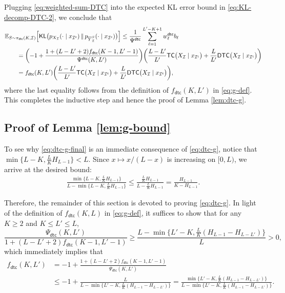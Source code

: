 \documentclass[english]{article}
\newcommand{\cI}{\mathcal{I}}
\newcommand{\bE}{\mathbb{E}}
\newcommand{\KL}{\mathsf{KL}}
\newcommand{\ol}{\overline}
\newcommand{\TC}{\mathsf{TC}}
\newcommand{\DTC}{\mathsf{DTC}}
\newcommand{\dtc}{\mathsf{dtc}}
\begin{document}
Plugging \eqref{eq:weighted-sum-DTC} into the expected KL error bound in \eqref{eq:KL-decomp-DTC-2}, we conclude that
\begin{align}
    &\bE_{S \sim \pi_{\dtc}(K, \cI)} \Big[\KL\big(p_{X_{\cI}}(\cdot \mid x_{\cI^\mathsf{c}}) \,\|\, p_{\ol Y_{\cI}^S}(\cdot \mid x_{\cI^\mathsf{c}}) \big)\Big] 
    \leq \frac{1}{\Psi^\dtc}\sum_{\ell = 1}^{L'-K+1} w^\dtc_{\ell} b_{\ell} \notag\\
     &\qquad = \biggl(-1 + \frac{1 + (L-L'+2)f_\dtc(K-1, L'-1)}{\Psi^\dtc(K, L')}\biggr) \bigg( \frac{L-L'}{L'}\TC\big(X_{\cI} \mid x_{\cI^\mathsf{c}} \big) + \frac{L}{L'}\DTC\big(X_{\cI} \mid x_{\cI^\mathsf{c}} \big)\bigg) \notag\\
     &\qquad = f_\dtc(K, L') \bigg( \frac{L-L'}{L'}\TC\big(X_{\cI} \mid x_{\cI^\mathsf{c}} \big) + \frac{L}{L'}\DTC\big(X_{\cI} \mid x_{\cI^\mathsf{c}} \big)\bigg), \label{eq:KL-bound-final-DTC}
\end{align}
where the last equality follows from the definition of $ f_\dtc(K, L') $ in \eqref{eq:g-def}.
This completes the inductive step and hence the proof of Lemma \ref{lem:dtc-g}.



\subsection{Proof of Lemma \ref{lem:g-bound}}
\label{sec:proof-g-bound}

To see why \eqref{eq:dtc-g-final} is an immediate consequence of \eqref{eq:dtc-g}, notice that $\min\{ L - K, \frac{L}{K}H_{L-1} \} < L$.
Since $x \mapsto x/(L-x)$ is increasing on $[0,L)$, we arrive at the desired bound:
\begin{align*}
\frac{\min\{L-K, \frac{L}{K}H_{L-1} \}}{L - \min\{L-K, \frac{L}{K}H_{L-1} \}} \leq \frac{\frac{L}{K}H_{L-1}}{L - \frac{L}{K}H_{L-1}} = \frac{ H_{L-1}}{K - H_{L-1}}.
\end{align*}

Therefore, the remainder of this section is devoted to proving \eqref{eq:dtc-g}.
In light of the definition of $ f_\dtc(K, L) $ in \eqref{eq:g-def}, it suffices to show that for any $K \geq 2$ and $K \leq L' \leq L$,
\begin{equation}
    \frac{\Psi_\dtc(K, L')}{1 + (L-L'+2)f_\dtc(K-1, L'-1)} \geq \frac{L-\min\{L'-K, \frac{L}{K}(H_{L-1} - H_{L-L'} )\}}{L} > 0, \label{eq:dtc-error-bound-psi}
\end{equation}
which immediately implies that
\begin{align*}
    f_\dtc(K, L') &= -1 + \frac{1 + (L-L'+2)f_\dtc(K-1, L'-1)}{\Psi_\dtc(K, L')} \\
    &\leq -1 + \frac{L}{L-\min\{L'-K, \frac{L}{K}(H_{L-1} - H_{L-L'} )\}}= \frac{\min\{L'-K, \frac{L}{K}(H_{L-1} - H_{L-L'} )\}}{L - \min\{L'-K, \frac{L}{K}(H_{L-1} - H_{L-L'} )\}}.
\end{align*}
\end{document}
